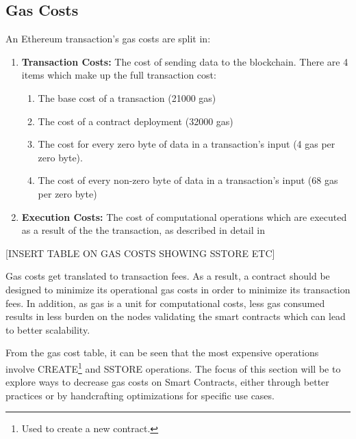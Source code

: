 \subsection{Gas Costs}
An Ethereum transaction's gas costs are split in: %
\begin{enumerate}
    \item \textbf{Transaction Costs:} The cost of sending data to the blockchain. There are 4 items which make up the full transaction cost:
        \begin{enumerate}
            \item The base cost of a transaction (21000 gas)
            \item The cost of a contract deployment (32000 gas)
            \item The cost for every zero byte of data in a transaction's input (4 gas per zero byte).
            \item The cost of every non-zero byte of data in a transaction's input (68 gas per zero byte)
        \end{enumerate}
    \item \textbf{Execution Costs:} The cost of computational operations which are executed as a result of the the transaction, as described in detail in \cite{ethereum, gas} 
\end{enumerate} 

[INSERT TABLE ON GAS COSTS SHOWING SSTORE ETC]



% 
Gas costs get translated to transaction fees. As a result, a contract should be designed to minimize its operational gas costs in order to minimize its transaction fees. In addition, as gas is a unit for computational costs, less gas consumed results in less burden on the nodes validating the smart contracts which can lead to better scalability.

From the gas cost table, it can be seen that the most expensive operations involve CREATE\footnote{Used to create a new contract.} and SSTORE operations. The focus of this section will be to explore ways to decrease gas costs on Smart Contracts, either through better practices or by handcrafting optimizations for specific use cases.

